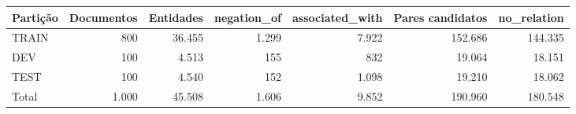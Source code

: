 \begin{tabular}{lrrrrrr}
\toprule
Partição & Documentos & Entidades & negation\_of & associated\_with & Pares candidatos & no\_relation \\
\midrule
TRAIN & 800 & 36.455 & 1.299 & 7.922 & 152.686 & 144.335 \\
DEV & 100 & 4.513 & 155 & 832 & 19.064 & 18.151 \\
TEST & 100 & 4.540 & 152 & 1.098 & 19.210 & 18.062 \\
Total & 1.000 & 45.508 & 1.606 & 9.852 & 190.960 & 180.548 \\
\bottomrule
\end{tabular}
